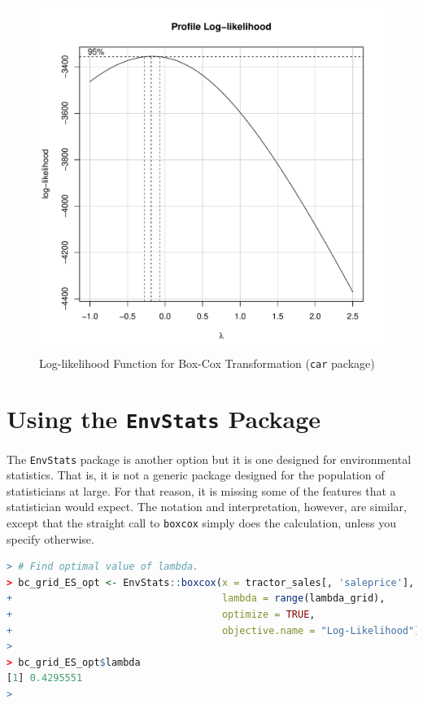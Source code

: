 \begin{figure}[h!]
  \centering
  \includegraphics[scale = 0.5, keepaspectratio=true]{../Figures/plot_like_car}
  \caption{Log-likelihood Function for Box-Cox Transformation (\texttt{car} package)} \label{fig:plot_like_car}
\end{figure}


\clearpage
\section*{Using the \texttt{EnvStats} Package}


The \texttt{EnvStats} package is another option
but it is one designed for environmental statistics.
That is, it is not a generic package designed for the population of statisticians at large.
For that reason, it is missing some of the features that
a statistician would expect.
The notation and interpretation, however, are similar, 
except that the straight call to \texttt{boxcox}
simply does the calculation, 
unless you specify otherwise.

\begin{lstlisting}[language=R]
> # Find optimal value of lambda.
> bc_grid_ES_opt <- EnvStats::boxcox(x = tractor_sales[, 'saleprice'],
+                                    lambda = range(lambda_grid),
+                                    optimize = TRUE,
+                                    objective.name = "Log-Likelihood")
> 
> bc_grid_ES_opt$lambda
[1] 0.4295551
> 
\end{lstlisting}


